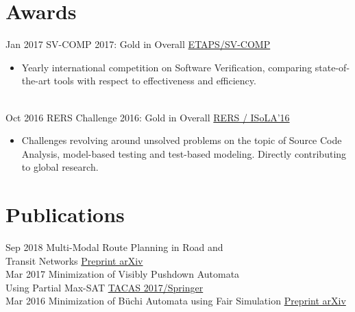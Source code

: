 \documentclass[letterpaper]{twentysecondcv} %
\begin{document}

\section{Awards}
\begin{twenty} %
	\twentyitem
    		{Jan 2017}
		{}
        		{SV-COMP 2017: Gold in Overall}
        		{\href{https://sv-comp.sosy-lab.org/2017/}{ETAPS/SV-COMP}}
        		{}
        		{\begin{itemize}
        			\item Yearly international competition on Software Verification, comparing state-of-the-art tools
        				with respect to effectiveness and efficiency.
        		\end{itemize}}\\
        	\twentyitem
    		{Oct 2016}
		{}
        		{RERS Challenge 2016: Gold in Overall}
        		{\href{http://rers-challenge.org/2016/}{RERS / ISoLA'16}}
        		{}
        		{\begin{itemize}
        			\item Challenges revolving around unsolved problems on the topic of Source Code Analysis,
        				model-based testing and test-based modeling. Directly contributing to global research.
        		\end{itemize}}
\end{twenty}

\vspace{6mm}


\section{Publications}
\begin{twenty} %
	\twentyitem
    		{Sep 2018}
		{}
        		{Multi-Modal Route Planning in Road and\\Transit Networks}
        		{\href{https://arxiv.org/abs/1809.05481}{Preprint arXiv}}
        		{}
        		{}\\
	\twentyitem
    		{Mar 2017}
		{}
        		{Minimization of Visibly Pushdown Automata\\Using Partial Max-SAT}
        		{\href{https://link.springer.com/chapter/10.1007/978-3-662-54577-5_27}{TACAS 2017/Springer}}
        		{}
        		{}\\
        	\twentyitem
    		{Mar 2016}
		{}
        		{Minimization of Büchi Automata using Fair Simulation}
        		{\href{https://arxiv.org/abs/1603.01107}{Preprint arXiv}}
        		{}
        		{}
\end{twenty}
\end{document}
